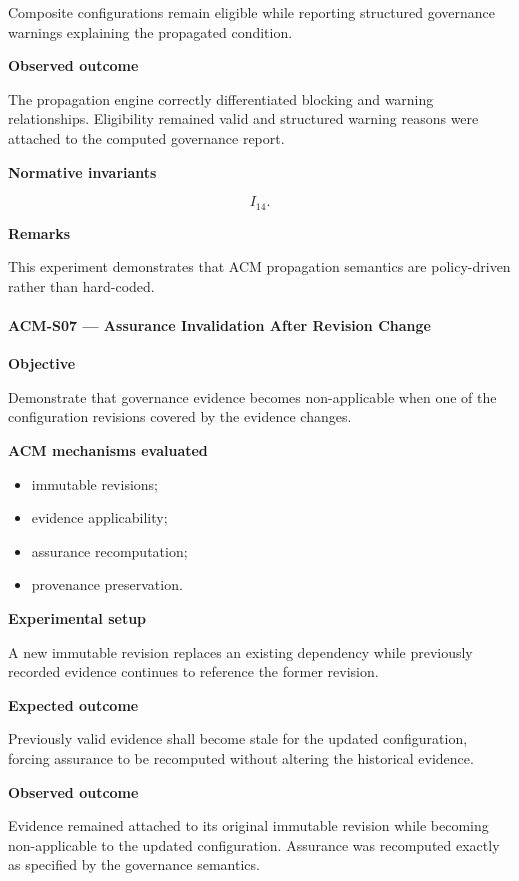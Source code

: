 \documentclass[10pt]{article}
\begin{document}
Composite configurations remain eligible while reporting structured governance
warnings explaining the propagated condition.

\textbf{Observed outcome}

The propagation engine correctly differentiated blocking and warning
relationships. Eligibility remained valid and structured warning reasons were
attached to the computed governance report.

\textbf{Normative invariants}

\[
I_{14}.
\]

\textbf{Remarks}

This experiment demonstrates that ACM propagation semantics are policy-driven
rather than hard-coded.

\paragraph{ACM-S07 --- Assurance Invalidation After Revision Change}

\textbf{Objective}

Demonstrate that governance evidence becomes non-applicable when one of the
configuration revisions covered by the evidence changes.

\textbf{ACM mechanisms evaluated}

\begin{itemize}
    \item immutable revisions;
    \item evidence applicability;
    \item assurance recomputation;
    \item provenance preservation.
\end{itemize}

\textbf{Experimental setup}

A new immutable revision replaces an existing dependency while previously
recorded evidence continues to reference the former revision.

\textbf{Expected outcome}

Previously valid evidence shall become stale for the updated configuration,
forcing assurance to be recomputed without altering the historical evidence.

\textbf{Observed outcome}

Evidence remained attached to its original immutable revision while becoming
non-applicable to the updated configuration. Assurance was recomputed exactly
as specified by the governance semantics.
\end{document}
